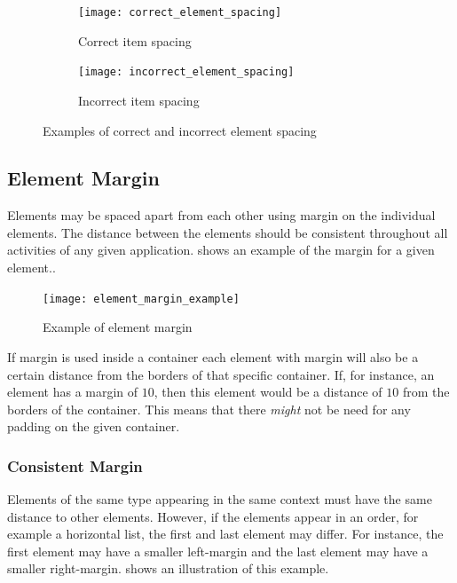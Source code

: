 \begin{figure}[!htbp]
    \centering
    \begin{subfigure}[t]{0.4\textwidth}
        \centering
        \texttt{[image: correct\_element\_spacing]}
        \caption{Correct item spacing}
        \label{fig:correct_element_spacing}
    \end{subfigure}
    \hspace{5em} 
    \begin{subfigure}[t]{0.4\textwidth}
        \centering
        \texttt{[image: incorrect\_element\_spacing]}
        \caption{Incorrect item spacing}
        \label{fig:incorrect_element_spacing}
    \end{subfigure}
    
    \caption{Examples of correct and incorrect element spacing}
    \label{fig:element_spacing_examples}
\end{figure}

\subsection{Element Margin}
Elements may be spaced apart from each other using margin on the individual elements. The distance between the elements should be consistent throughout all activities of any given application.  shows an example of the margin for a given element.. 

\begin{figure}[h]
        \centering
        \texttt{[image: element\_margin\_example]}
        \caption{Example of element margin}
        \label{fig:element_margin_example}
\end{figure}

\begin{note}
        If margin is used inside a container each element with margin will also be a certain distance from the borders of that specific container. If, for instance, an element has a margin of $10$, then this element would be a distance of $10$ from the borders of the container. This means that there \textit{might} not be need for any padding on the given container.
\end{note}

\subsubsection{Consistent Margin}
Elements of the same type appearing in the same context must have the same distance to other elements. However, if the elements appear in an order, for example a horizontal list, the first and last element may differ. For instance, the first element may have a smaller left-margin and the last element may have a smaller right-margin.  shows an illustration of this example.

